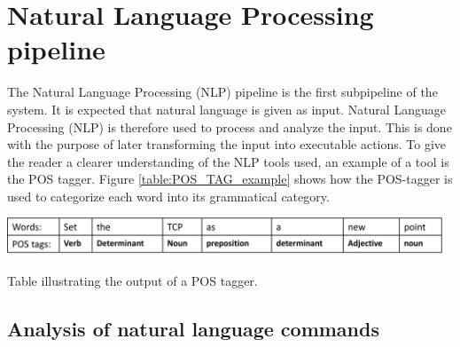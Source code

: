 \chapter{Natural Language Processing pipeline}\label{ch:NLP}
The Natural Language Processing (NLP) pipeline is the first subpipeline of the system. It is expected that natural language is given as input. Natural Language  Processing (NLP) is therefore used to process and analyze the input. This is done with the purpose of later transforming the input into executable actions. 
To give the reader a clearer understanding of the NLP tools used, an example of a tool is the POS tagger. Figure \ref{table:POS_TAG_example} shows how the POS-tagger is used to categorize each word into its grammatical category. 

\begin{table}[ht]
    \centering
    \includegraphics[width=13cm]{img/POs_TAG_example.png}
    \caption{Table illustrating the output of a POS tagger.}
    \label{table:POS_TAG_example}
\end{table}



\section{Analysis of natural language commands} \label{sec:app}

